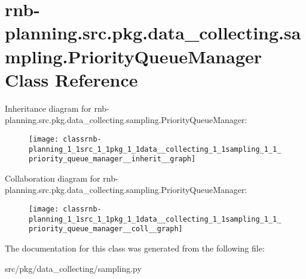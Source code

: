 \hypertarget{classrnb-planning_1_1src_1_1pkg_1_1data__collecting_1_1sampling_1_1_priority_queue_manager}{}\section{rnb-\/planning.src.\+pkg.\+data\+\_\+collecting.\+sampling.\+Priority\+Queue\+Manager Class Reference}
\label{classrnb-planning_1_1src_1_1pkg_1_1data__collecting_1_1sampling_1_1_priority_queue_manager}


Inheritance diagram for rnb-\/planning.src.\+pkg.\+data\+\_\+collecting.\+sampling.\+Priority\+Queue\+Manager\+:\nopagebreak
\begin{figure}[H]
\begin{center}
\leavevmode
\texttt{[image: classrnb-planning\_1\_1src\_1\_1pkg\_1\_1data\_\_collecting\_1\_1sampling\_1\_1\_priority\_queue\_manager\_\_inherit\_\_graph]}
\end{center}
\end{figure}


Collaboration diagram for rnb-\/planning.src.\+pkg.\+data\+\_\+collecting.\+sampling.\+Priority\+Queue\+Manager\+:\nopagebreak
\begin{figure}[H]
\begin{center}
\leavevmode
\texttt{[image: classrnb-planning\_1\_1src\_1\_1pkg\_1\_1data\_\_collecting\_1\_1sampling\_1\_1\_priority\_queue\_manager\_\_coll\_\_graph]}
\end{center}
\end{figure}


The documentation for this class was generated from the following file\+:\begin{DoxyCompactItemize}
\item 
src/pkg/data\+\_\+collecting/sampling.\+py\end{DoxyCompactItemize}
